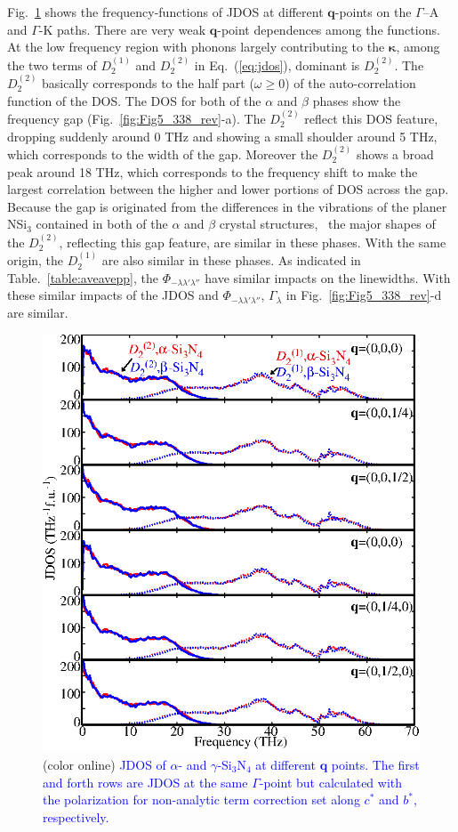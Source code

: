 \documentclass[twocolumn,amsmath,amssymb,a4paper,prb,superscriptaddress,floatfix]{revtex4-1}
\begin{document}
Fig.~\ref{fig:Fig6_338} shows the frequency-functions of JDOS at different
$\mathbf{q}$-points on the $\Gamma$--A and $\Gamma$-K paths. There are very
weak $\mathbf{q}$-point dependences among the functions.  At the low frequency
region with phonons largely contributing to the $\boldsymbol{\kappa}$, among the two terms of
$D_2^{(1)}$ and $D_2^{(2)}$ in Eq.~(\ref{eq:jdos}), dominant is
$D_2^{(2)}$.
The $D_2^{(2)}$ basically corresponds to the half part ($\omega \geq  0$) of the
auto-correlation function of the DOS. The DOS for both of the $\alpha$ and $\beta$
phases show the frequency gap (Fig.~\ref{fig:Fig5_338_rev}-a). The $D_2^{(2)}$
reflect this DOS feature, dropping suddenly around 0 THz and showing a
small shoulder around 5 THz, which corresponds to the width of the gap. Moreover
the $D_2^{(2)}$ shows a broad peak around 18 THz, which corresponds to the frequency
shift to make the largest correlation between the higher and lower portions of
DOS across the gap.  Because the gap is  originated from the
differences in the vibrations of the planer NSi$_3$ contained in both of the
$\alpha$ and $\beta$ crystal structures,~\cite{kuwabara} the major shapes of the $D_2^{(2)}$,
reflecting this gap feature, are similar in these phases. With the same origin,
the $D_2^{(1)}$ are also similar in these phases. 
As indicated in Table.~\ref{table:aveavepp}, the $\Phi_{-\lambda\lambda'\lambda''}$
have similar impacts on the linewidths. 
With these similar impacts of
the JDOS and $\Phi_{-\lambda\lambda'\lambda''}$,
$\Gamma_\lambda$ in Fig.~\ref{fig:Fig5_338_rev}-d are similar.  

\begin{figure}[ht]
 \centering
  \includegraphics[width=0.9\linewidth]{figure_jdoss.eps} \caption{(color
	  online) \textcolor{blue}{JDOS of $\alpha$- and $\gamma$-Si$_3$N$_4$ at different $\mathbf q$ points.
  The first and forth rows are JDOS at the same $\Gamma$-point but calculated with the polarization for non-analytic term correction set along $c^*$ and $b^*$, respectively.} \label{fig:Fig6_338} }
 \centering
\end{figure}
\end{document}
